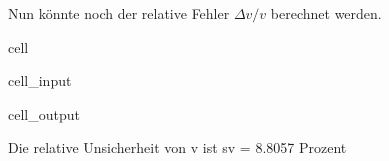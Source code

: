 \documentclass[letterpaper,10pt,english]{jupyterBook}
\begin{document}
\sphinxAtStartPar
Nun könnte noch der relative Fehler \(\Delta v/v\) berechnet werden.

\begin{sphinxuseclass}{cell}\begin{sphinxVerbatimInput}

\begin{sphinxuseclass}{cell_input}
\begin{sphinxVerbatim}[commandchars=\\\{\}]
 
\end{sphinxVerbatim}

\end{sphinxuseclass}\end{sphinxVerbatimInput}
\begin{sphinxVerbatimOutput}

\begin{sphinxuseclass}{cell_output}
\begin{sphinxVerbatim}[commandchars=\\\{\}]
Die relative Unsicherheit von v ist 	 s\PYGZus{}v = 8.8057 Prozent
\end{sphinxVerbatim}

\end{sphinxuseclass}\end{sphinxVerbatimOutput}

\end{sphinxuseclass}
\end{document}
